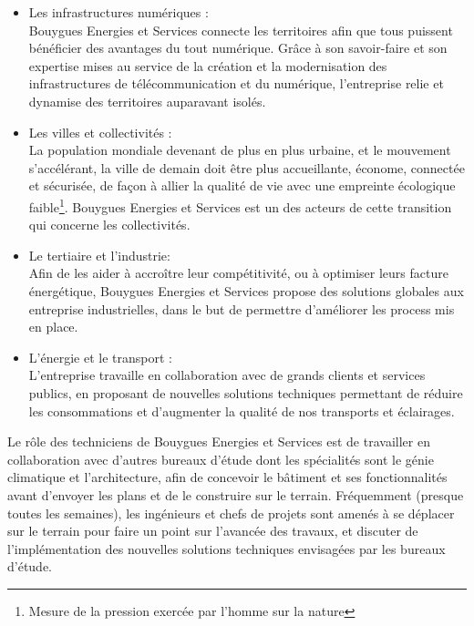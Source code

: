 \documentclass[a4paper]{article}
\begin{document}
    \begin{itemize}

    \item Les infrastructures numériques : \\
        
        Bouygues Energies et Services connecte les territoires afin que tous puissent bénéficier des avantages du tout numérique. Grâce à son savoir-faire et son expertise mises au service de la création et la modernisation des infrastructures de télécommunication et du numérique, l'entreprise relie et dynamise des territoires auparavant isolés. \\

    \item Les villes et collectivités : \\

        La population mondiale devenant de plus en plus urbaine, et le mouvement s'accélérant, la ville de demain doit être plus accueillante, économe, connectée et sécurisée, de façon à allier la qualité de vie avec une empreinte écologique faible\footnote{Mesure de la pression exercée par l'homme sur la nature}. Bouygues Energies et Services est un des acteurs de cette transition qui concerne les collectivités. \\

    \item Le tertiaire et l'industrie: \\

        Afin de les aider à accroître leur compétitivité, ou à optimiser leurs facture énergétique, Bouygues Energies et Services propose des solutions globales aux entreprise industrielles, dans le but de permettre d'améliorer les process mis en place. \\

    \item L'énergie et le transport : \\

        L'entreprise travaille en collaboration avec de grands clients et services publics, en proposant de nouvelles solutions techniques permettant de réduire les consommations et d'augmenter la qualité de nos transports et éclairages. 

    \end{itemize}
    \vspace{5pt}
    
    Le rôle des techniciens de Bouygues Energies et Services est de travailler en collaboration avec d’autres bureaux d’étude dont les spécialités sont le génie climatique et l’architecture, afin de concevoir le bâtiment et ses fonctionnalités avant d’envoyer les plans et de le construire sur le terrain. Fréquemment (presque toutes les semaines), les ingénieurs et chefs de projets sont amenés à se déplacer sur le terrain pour faire un point sur l’avancée des travaux, et discuter de l'implémentation des nouvelles solutions techniques envisagées par les bureaux d'étude. \\
 
\end{document}
